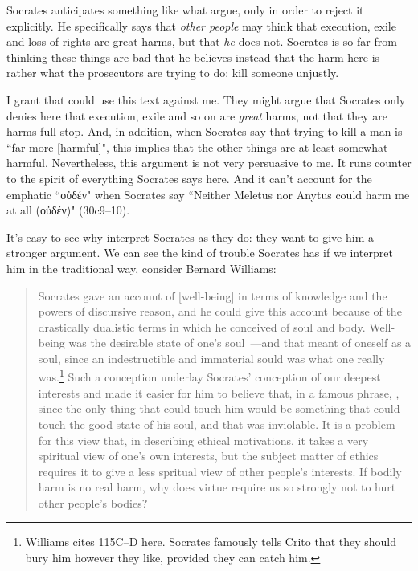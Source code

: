 \documentclass[11pt]{article}
\begin{document}
Socrates anticipates something like what \citeauthor{brickhouse2004} argue, only in order to reject it explicitly.  He specifically says that \emph{other people} may think that execution, exile and loss of rights are great harms, but that \emph{he} does not.  Socrates is so far from thinking these things are bad that he believes instead that the harm here is rather what the prosecutors are trying to do: kill someone unjustly.

I grant that \citeauthor{brickhouse2004} could use this text against me.  They might argue that Socrates only denies here that execution, exile and so on are \emph{great} harms, not that they are harms full stop.  And, in addition, when Socrates say that trying to kill a man is ``far more [harmful]", this implies that the other things are at least somewhat harmful.  Nevertheless, this argument is not very persuasive to me.  It runs counter to the spirit of everything Socrates says here. And it can't account for the emphatic ``{\g οὐδέν}" when Socrates say ``Neither Meletus nor Anytus could harm me at all ({\g οὐδέν})" (30c9--10).

It's easy to see why \citeauthor{brickhouse2004} interpret Socrates as they do: they want to give him a stronger argument.  We can see the kind of trouble Socrates has if we interpret him in the traditional way, consider Bernard Williams:

\begin{quote}
    Socrates gave an account of [well-being] in terms of knowledge and the powers of discursive reason, and he could give this account because of the drastically dualistic terms in which he conceived of soul and body. Well-being was the desirable state of one's soul~---and that meant of oneself as a soul, since an indestructible and immaterial sould was what one really was.\footnote{Williams cites  115C--D here.  Socrates famously tells Crito that they should bury him however they like, provided they can catch him.}  Such a conception underlay Socrates' conception of our deepest interests and made it easier for him to believe that, in a famous phrase, , since the only thing that could touch him would be something that could touch the good state of his soul, and that was inviolable.  It is a problem for this view that, in describing ethical motivations, it takes a very spiritual view of one's own interests, but the subject matter of ethics requires it to give a less spritual view of other people's interests. If bodily harm is no real harm, why does virtue require us so strongly not to hurt other people's bodies? \citep[34]{williams1985}
\end{quote}
\end{document}
